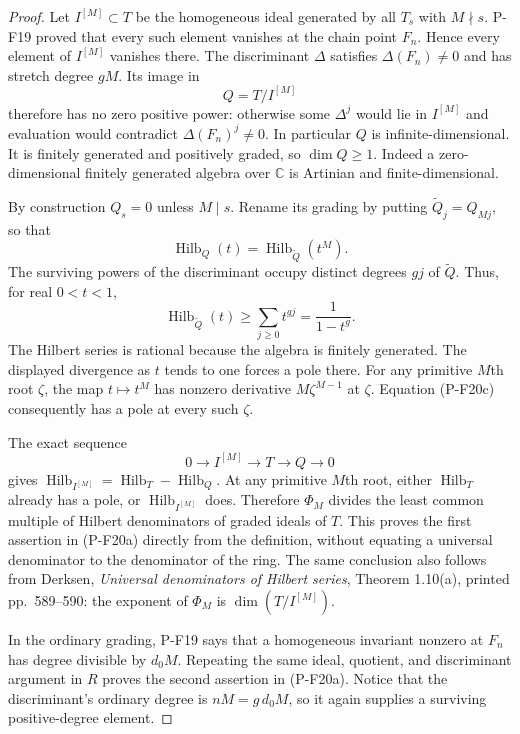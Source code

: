 \begin{proof}
Let $I^{[M]}\subset T$ be the homogeneous ideal generated by all
$T_s$ with $M\nmid s$. P-F19 proved that every such element
vanishes at the chain point $F_n$. Hence every element of
$I^{[M]}$ vanishes there. The discriminant $\Delta$ satisfies
$\Delta(F_n)\ne0$ and has stretch degree $gM$. Its image in
\[
 Q=T/I^{[M]}
\]
therefore has no zero positive power: otherwise some $\Delta^j$
would lie in $I^{[M]}$ and evaluation would contradict
$\Delta(F_n)^j\ne0$. In particular $Q$ is infinite-dimensional.
It is finitely generated and positively graded, so $\dim Q\ge1$.
Indeed a zero-dimensional finitely generated algebra over
$\mathbb C$ is Artinian and finite-dimensional.

By construction $Q_s=0$ unless $M\mid s$. Rename its grading by
putting $\widetilde Q_j=Q_{Mj}$, so that
\[
 \operatorname{Hilb}_Q(t)
   =\operatorname{Hilb}_{\widetilde Q}(t^M).
 \tag{P-F20c}
\]
The surviving powers of the discriminant occupy distinct degrees
$gj$ of $\widetilde Q$. Thus, for real $0<t<1$,
\[
 \operatorname{Hilb}_{\widetilde Q}(t)
    \ge\sum_{j\ge0}t^{gj}=\frac1{1-t^g}.
\]
The Hilbert series is rational because the algebra is finitely
generated. The displayed divergence as $t$ tends to one forces
a pole there. For any primitive $M$th root $\zeta$, the map
$t\mapsto t^M$ has nonzero derivative $M\zeta^{M-1}$ at
$\zeta$. Equation (P-F20c) consequently has a pole at every
such $\zeta$.

The exact sequence
\[
 0\longrightarrow I^{[M]}\longrightarrow T
     \longrightarrow Q\longrightarrow0
\]
gives
$\operatorname{Hilb}_{I^{[M]}}=
 \operatorname{Hilb}_T-\operatorname{Hilb}_Q$.
At any primitive $M$th root, either $\operatorname{Hilb}_T$
already has a pole, or $\operatorname{Hilb}_{I^{[M]}}$ does.
Therefore $\Phi_M$ divides the least common multiple of
Hilbert denominators of graded ideals of $T$. This proves the
first assertion in (P-F20a) directly from the definition, without
equating a universal denominator to the denominator of the ring.
The same conclusion also follows from Derksen, \emph{Universal
denominators of Hilbert series}, Theorem 1.10(a), printed
pp.~589--590: the exponent of $\Phi_M$ is
$\dim(T/I^{[M]})$.

In the ordinary grading, P-F19 says that a homogeneous invariant
nonzero at $F_n$ has degree divisible by $d_0M$. Repeating the
same ideal, quotient, and discriminant argument in $R$ proves
the second assertion in (P-F20a). Notice that the discriminant's
ordinary degree is $nM=g\,d_0M$, so it again supplies a surviving
positive-degree element.


\end{proof}
